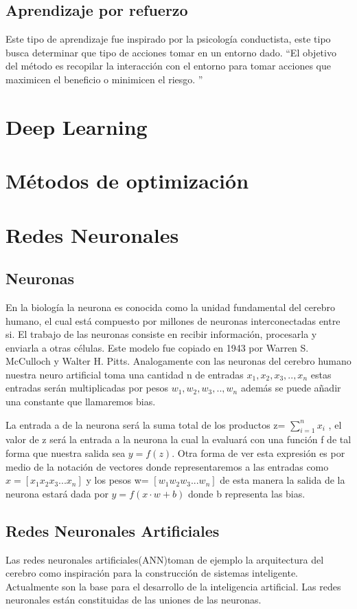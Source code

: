 \subsection*{Aprendizaje por refuerzo}
Este tipo de aprendizaje fue inspirado por la psicología conductista, este tipo busca determinar que tipo de acciones tomar en un entorno dado. \textquotedblleft El objetivo del método es recopilar la interacción con el entorno para tomar acciones que maximicen el beneficio o minimicen el riesgo. \textquotedblright \cite{WEBSITE:1}

\section{Deep Learning}

\section{Métodos de optimización}
\section{Redes Neuronales}
\subsection{Neuronas}
En la biología la neurona es conocida como la unidad fundamental del cerebro humano, el cual está compuesto por millones de neuronas interconectadas entre si. El trabajo de las neuronas consiste en recibir información, procesarla y enviarla a otras células. Este modelo fue copiado en 1943 por Warren S. McCulloch y Walter H. Pitts. Analogamente con las neuronas del cerebro humano nuestra neuro artificial toma una cantidad n de entradas $x_{1}, x_{2}, x_{3}, .. , x_{n}$ estas entradas serán multiplicadas por pesos $w_{1}, w_{2}, w_{3}, .. , w_{n}$ además se puede añadir una constante que llamaremos bias. 

La entrada a de la neurona será la suma total de los productos z=  $\sum_{i=1}^{n}x_{i}$ , el valor de z será la entrada a la neurona la cual la evaluará con una función f de tal forma que nuestra salida sea $y=f(z)$. Otra forma de ver esta expresión es por medio de la notación de vectores donde representaremos a las entradas como $x= [x_{1}  x_{2}  x_{3}  ...  x_{n}]$ y los pesos w= $[w_{1}  w_{2}  w_{3}  ...  w_{n}]$ de esta manera la salida de la neurona estará dada por $y=f(x\cdot w+b)$ donde b representa las bias. 

\subsection{Redes Neuronales Artificiales}
Las redes neuronales artificiales(ANN)toman de ejemplo la arquitectura del cerebro como inspiración para la construcción de sistemas inteligente. Actualmente son la base para el desarrollo de la inteligencia artificial. Las redes neuronales están constituidas de las uniones de las neuronas.

